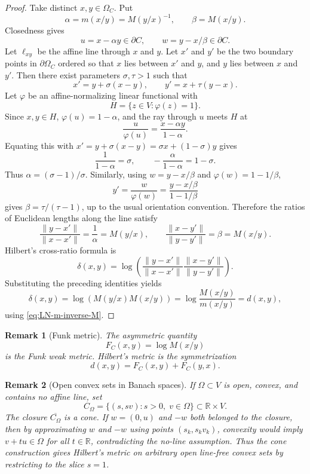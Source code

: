 \documentclass[11pt]{article}
\newtheorem{remark}{Remark}
\newcommand{\R}{\mathbb{R}}
\begin{document}
\begin{proof}
Take distinct \(x,y\in\Omega_C\).  Put
\[
  \alpha=m(x/y)=M(y/x)^{-1},
  \qquad
  \beta=M(x/y).
\]
Closedness gives
\[
  u=x-\alpha y\in\partial C,
  \qquad
  w=y-x/\beta\in\partial C.
\]
Let \(\ell_{xy}\) be the affine line through \(x\) and \(y\).  Let \(x'\) and \(y'\) be the two boundary points in \(\partial\Omega_C\) ordered so that \(x\) lies between \(x'\) and \(y\), and \(y\) lies between \(x\) and \(y'\).  Then there exist parameters \(\sigma,\tau>1\) such that
\[
  x'=y+\sigma(x-y),
  \qquad
  y'=x+\tau(y-x).
\]
Let \(\varphi\) be an affine-normalizing linear functional with
\[
  H=\{z\in V:\varphi(z)=1\}.
\]
Since \(x,y\in H\), \(\varphi(u)=1-\alpha\), and the ray through \(u\) meets \(H\) at
\[
  \frac{u}{\varphi(u)}=\frac{x-\alpha y}{1-\alpha}.
\]
Equating this with \(x'=y+\sigma(x-y)=\sigma x+(1-
\sigma)y\) gives
\[
  \frac1{1-\alpha}=\sigma,
  \qquad
  -\frac{\alpha}{1-\alpha}=1-\sigma.
\]
Thus \(\alpha=(\sigma-1)/\sigma\).  Similarly, using \(w=y-x/\beta\) and \(\varphi(w)=1-1/\beta\),
\[
  y'=\frac{w}{\varphi(w)}=\frac{y-x/\beta}{1-1/\beta}
\]
gives \(\beta=\tau/(\tau-1)\), up to the usual orientation convention.  Therefore the ratios of Euclidean lengths along the line satisfy
\[
  \frac{\|y-x'\|}{\|x-x'\|}=\frac{1}{\alpha}=M(y/x),
  \qquad
  \frac{\|x-y'\|}{\|y-y'\|}=\beta=M(x/y).
\]
Hilbert's cross-ratio formula is
\[
  \delta(x,y)=\log\left(
  \frac{\|y-x'\|}{\|x-x'\|}
  \frac{\|x-y'\|}{\|y-y'\|}
  \right).
\]
Substituting the preceding identities yields
\[
  \delta(x,y)=\log(M(y/x)M(x/y))
  =\log\frac{M(x/y)}{m(x/y)}=d(x,y),
\]
using \eqref{eq:LN-m-inverse-M}.
\end{proof}

\begin{remark}[Funk metric]
The asymmetric quantity
\[
  F_C(x,y)=\log M(x/y)
\]
is the Funk weak metric.  Hilbert's metric is the symmetrization
\[
  d(x,y)=F_C(x,y)+F_C(y,x).
\]
\end{remark}

\begin{remark}[Open convex sets in Banach spaces]
If \(\Omega\subset V\) is open, convex, and contains no affine line, set
\[
  C_\Omega=\{(s,sv):s>0,\;v\in\Omega\}\subset \R\times V.
\]
The closure \(\overline{C_\Omega}\) is a cone.  If \(w=(0,u)\) and \(-w\) both belonged to the closure, then by approximating \(w\) and \(-w\) using points \((s_k,s_kv_k)\), convexity would imply \(v+tu\in\Omega\) for all \(t\in\R\), contradicting the no-line assumption.  Thus the cone construction gives Hilbert's metric on arbitrary open line-free convex sets by restricting to the slice \(s=1\).
\end{remark}
\end{document}
